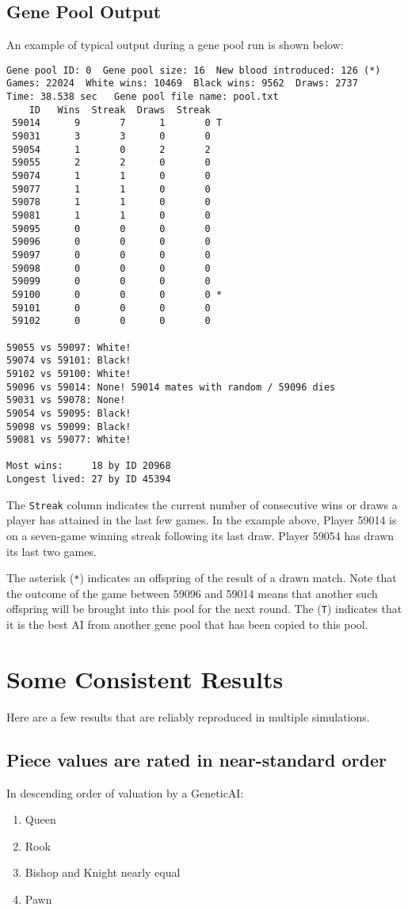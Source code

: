 \documentclass[letter]{article}
\renewcommand\_{\textunderscore\allowbreak}
\begin{document}
\subsection{Gene Pool Output}
An example of typical output during a gene pool run is shown below:
\begin{verbatim}
Gene pool ID: 0  Gene pool size: 16  New blood introduced: 126 (*)
Games: 22024  White wins: 10469  Black wins: 9562  Draws: 2737
Time: 38.538 sec   Gene pool file name: pool.txt
    ID   Wins  Streak  Draws  Streak
 59014      9       7      1       0 T
 59031      3       3      0       0
 59054      1       0      2       2
 59055      2       2      0       0
 59074      1       1      0       0
 59077      1       1      0       0
 59078      1       1      0       0
 59081      1       1      0       0
 59095      0       0      0       0
 59096      0       0      0       0
 59097      0       0      0       0
 59098      0       0      0       0
 59099      0       0      0       0
 59100      0       0      0       0 *
 59101      0       0      0       0
 59102      0       0      0       0

59055 vs 59097: White!
59074 vs 59101: Black!
59102 vs 59100: White!
59096 vs 59014: None! 59014 mates with random / 59096 dies
59031 vs 59078: None!
59054 vs 59095: Black!
59098 vs 59099: Black!
59081 vs 59077: White!

Most wins:     18 by ID 20968
Longest lived: 27 by ID 45394
\end{verbatim}
The \verb|Streak| column indicates the current number of consecutive wins or draws a player has attained in the last few games. In the example above, Player 59014 is on a seven-game winning streak following its last draw. Player 59054 has drawn its last two games.

The asterisk (\verb|*|) indicates an offspring of the result of a drawn match. Note that the outcome of the game between 59096 and 59014 means that another such offspring will be brought into this pool for the next round. The (\verb|T|) indicates that it is the best AI from another gene pool that has been copied to this pool.


\section{Some Consistent Results}

Here are a few results that are reliably reproduced in multiple simulations.

\subsection*{Piece values are rated in near-standard order}
In descending order of valuation by a Genetic\_AI:
\begin{enumerate}
	\item Queen
	\item Rook
	\item Bishop and Knight nearly equal
	\item Pawn
\end{enumerate}
\end{document}
